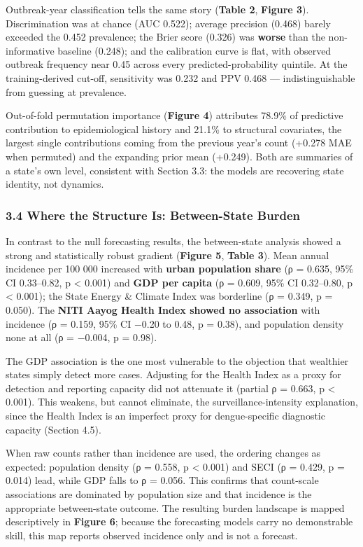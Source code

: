 \documentclass[
  10pt,
  twocolumn]{article}
\newcounter{none} %
\begin{document}
Outbreak-year classification tells the same story (\textbf{Table 2},
\textbf{Figure 3}). Discrimination was at chance (AUC 0.522); average
precision (0.468) barely exceeded the 0.452 prevalence; the Brier score
(0.326) was \textbf{worse} than the non-informative baseline (0.248);
and the calibration curve is flat, with observed outbreak frequency near
0.45 across every predicted-probability quintile. At the
training-derived cut-off, sensitivity was 0.232 and PPV 0.468 ---
indistinguishable from guessing at prevalence.

Out-of-fold permutation importance (\textbf{Figure 4}) attributes 78.9\%
of predictive contribution to epidemiological history and 21.1\% to
structural covariates, the largest single contributions coming from the
previous year's count (+0.278 MAE when permuted) and the expanding prior
mean (+0.249). Both are summaries of a state's own level, consistent
with Section 3.3: the models are recovering state identity, not
dynamics.

\subsubsection{3.4 Where the Structure Is: Between-State
Burden}\label{where-the-structure-is-between-state-burden}

In contrast to the null forecasting results, the between-state analysis
showed a strong and statistically robust gradient (\textbf{Figure 5},
\textbf{Table 3}). Mean annual incidence per 100 000 increased with
\textbf{urban population share} (ρ = 0.635, 95\% CI 0.33--0.82, p
\textless{} 0.001) and \textbf{GDP per capita} (ρ = 0.609, 95\% CI
0.32--0.80, p \textless{} 0.001); the State Energy \& Climate Index was
borderline (ρ = 0.349, p = 0.050). The \textbf{NITI Aayog Health Index
showed no association} with incidence (ρ = 0.159, 95\% CI −0.20 to 0.48,
p = 0.38), and population density none at all (ρ = −0.004, p = 0.98).

The GDP association is the one most vulnerable to the objection that
wealthier states simply detect more cases. Adjusting for the Health
Index as a proxy for detection and reporting capacity did not attenuate
it (partial ρ = 0.663, p \textless{} 0.001). This weakens, but cannot
eliminate, the surveillance-intensity explanation, since the Health
Index is an imperfect proxy for dengue-specific diagnostic capacity
(Section 4.5).

When raw counts rather than incidence are used, the ordering changes as
expected: population density (ρ = 0.558, p \textless{} 0.001) and SECI
(ρ = 0.429, p = 0.014) lead, while GDP falls to ρ = 0.056. This confirms
that count-scale associations are dominated by population size and that
incidence is the appropriate between-state outcome. The resulting burden
landscape is mapped descriptively in \textbf{Figure 6}; because the
forecasting models carry no demonstrable skill, this map reports
observed incidence only and is not a forecast.
\end{document}
